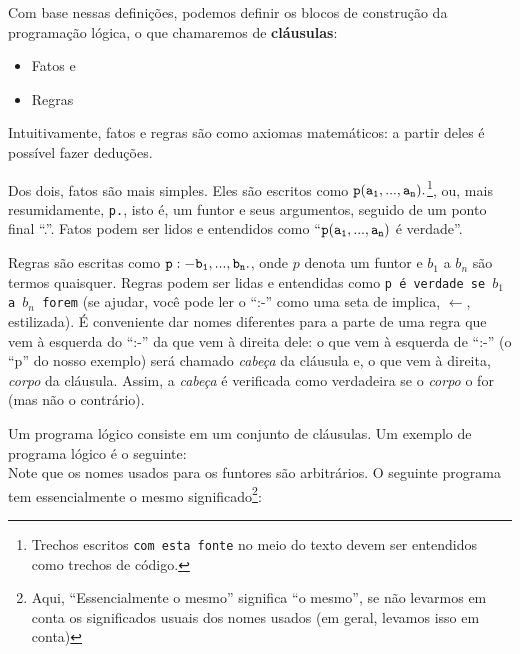 \documentclass{article}
\theoremstyle{remark}
\begin{document}
Com base nessas definições, podemos definir os blocos de construção da programação lógica, o que chamaremos de \textbf{cláusulas}:
\begin{itemize}
  \item Fatos e
  \item Regras
\end{itemize}

Intuitivamente, fatos e regras são como axiomas matemáticos: a partir deles é possível fazer deduções.

Dos dois, fatos são mais simples. Eles são escritos como  ${\tt p(a_1, ..., a_n).}$\footnote{Trechos escritos {\tt com esta fonte} no meio do texto devem ser entendidos como trechos de código.},  ou, mais resumidamente, {\tt p.}, isto é, um funtor e seus argumentos, seguido de um ponto final ``.''. Fatos podem ser lidos e entendidos como ``${\tt p(a_1, ..., a_n)}$ é verdade''.

Regras são escritas como ${\tt p :- b_1, ..., b_n.}$, onde $p$ denota um funtor e $b_1$ a $b_n$ são termos quaisquer. Regras podem ser lidas e entendidas como {\tt p é verdade se $b_1$ a $b_n$ forem} (se ajudar, você pode ler o ``:-'' como uma seta de implica, $\leftarrow$, estilizada). É conveniente dar nomes diferentes para a parte de uma regra que vem à esquerda do ``:-'' da que vem à direita dele: o que vem à esquerda de ``:-'' (o ``p'' do nosso exemplo) será chamado \textit{cabeça} da cláusula e, o que vem à direita, \textit{corpo} da cláusula. Assim, a
\textit{cabeça} é verificada como verdadeira se o \textit{corpo} o for (mas não o contrário).

Um programa lógico consiste em um conjunto de cláusulas. Um exemplo de programa lógico é o seguinte:\\



Note que os nomes usados para os funtores são arbitrários. O seguinte programa tem essencialmente o mesmo significado\footnote{ Aqui, ``Essencialmente o mesmo'' significa ``o mesmo'', se não levarmos em conta os significados usuais dos nomes usados (em geral, levamos isso em conta)}:\\



\end{document}
